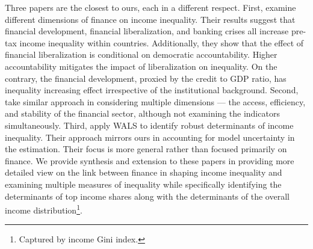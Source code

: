 \begin{refsection}
Three papers are the closest to ours, each in a different respect. First, \textcite{de2017finance} examine different dimensions of finance on income inequality. Their results suggest that financial development, financial liberalization, and banking crises all increase pre-tax income inequality within countries. Additionally, they show that the effect of financial liberalization is conditional on democratic accountability. Higher accountability mitigates the impact of liberalization on inequality. On the contrary, the financial development, proxied by the credit to GDP ratio, has inequality increasing effect irrespective of the institutional background. Second, \textcite{naceurzhang2016} take similar approach in considering multiple dimensions --- the access, efficiency, and stability of the financial sector, although not examining the indicators simultaneously.  Third, \textcite{furceri2019robust} apply \ac{WALS} to identify robust determinants of income inequality. Their approach mirrors ours in accounting for model uncertainty in the estimation. Their focus is more general rather than focused primarily on finance. We provide synthesis and extension to these papers in providing more detailed view on the link between finance in shaping income inequality and examining multiple measures of inequality while specifically identifying the determinants of top income shares along with the determinants of the overall income distribution\footnote{Captured by income Gini index.}.




\end{refsection}
